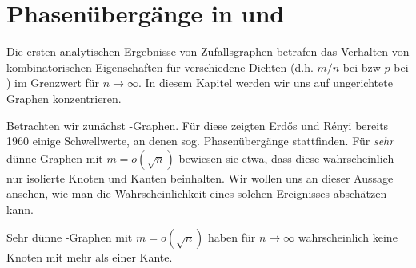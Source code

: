 \section{Phasenübergänge in \Gnp und \Gnm}
Die ersten analytischen Ergebnisse von Zufallsgraphen betrafen das Verhalten von kombinatorischen Eigenschaften für verschiedene Dichten (d.h. $m/n$ bei \Gnm bzw $p$ bei \Gnp) im Grenzwert für $n \to \infty$.
In  diesem Kapitel werden wir uns auf ungerichtete Graphen konzentrieren.

Betrachten wir zunächst \Gnm-Graphen.
Für diese zeigten Erd\H{o}s und R\'enyi bereits 1960 einige Schwellwerte, an denen sog. Phasenübergänge stattfinden.
Für \emph{sehr} dünne Graphen mit $m = o(\sqrt n)$ bewiesen sie etwa, dass diese wahrscheinlich nur isolierte Knoten und Kanten beinhalten.
Wir wollen uns an dieser Aussage ansehen, wie man die Wahrscheinlichkeit eines solchen Ereignisses abschätzen kann.

\begin{lemma}
    Sehr dünne \Gnm-Graphen mit $m = o(\sqrt n)$ haben für $n \to \infty$ wahrscheinlich keine Knoten mit mehr als einer Kante.
\end{lemma}

